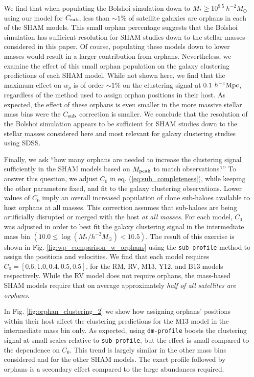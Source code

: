 \documentclass[a4paper,fleqn,usenatbib]{mnras}
\begin{document}
We find that when populating the Bolshoi simulation down to $M_* \geq 10^{9.5}~h^{-2}M_{\odot}$ using our model for $C_{\rm sub}$, less than $\sim 1\%$ of satellite galaxies are orphans in each of the SHAM models.  This small orphan percentage suggests that the Bolshoi simulation has sufficient resolution for SHAM studies down to the stellar masses considered in this paper.  Of course, populating these models down to lower masses would result in a larger contribution from orphans.  Nevertheless, we examine the effect of this small orphan population on the galaxy clustering predictions of each SHAM model.  While not shown here, we find that the maximum effect on $w_p$ is of order $\sim 1\%$ on the clustering signal at $0.1~h^{-1}{\rm Mpc}$, regardless of the method used to assign orphan positions in their host.  As expected, the effect of these orphans is even smaller in the more massive stellar mass bins were the $C_{\rm sub}$ correction is smaller.  We conclude that the resolution of the Bolshoi simulation appears to be sufficient for SHAM studies down to the stellar masses considered here and most relevant for galaxy clustering studies using SDSS.    

Finally, we ask ``how many orphans are needed to increase the clustering signal sufficiently in the SHAM models based on $M_{\rm peak}$ to match observations?''  To answer this question, we adjust $C_0$ in eq. (\ref{eq:sub_completeness}), while keeping the other parameters fixed, and fit to the galaxy clustering observations.  Lower values of $C_0$ imply an overall increased population of clone sub-haloes available to host orphans at all masses.  This correction assumes that sub-haloes are being artificially disrupted or merged with the host {\em at all masses}.  For each model, $C_0$ was adjusted in order to best fit the galaxy clustering signal in the intermediate mass bin $(10.0 \leq \log(M_*/h^{-2}M_{\odot}) <10.5)$.  The result of this exercise is shown in Fig. \ref{fig:wp_comparison_w_orphans} using the {\tt sub-profile} method to assign the positions and velocities.  We find that each model requires $C_{0} = [0.6,1.0, 0.4, 0.5, 0.5]$, for the RM, RV, M13, Y12, and B13 models respectively.  While the RV model does not require orphans, the mass-based SHAM models require that on average approximately {\em half of all satellites are orphans}.  

In Fig. \ref{fig:orphan_clustering_2} we show how assigning orphans' positions within their host affect the clustering predictions for the M13 model in the intermediate mass bin only.  As expected, using {\tt dm-profile} boosts the clustering signal at small scales relative to {\tt sub-profile}, but the effect is small compared to the dependence on $C_{0}$.  This trend is largely similar in the other mass bins considered and for the other SHAM models.  The exact profile followed by orphans is a secondary effect compared to the large abundances required.
\end{document}
